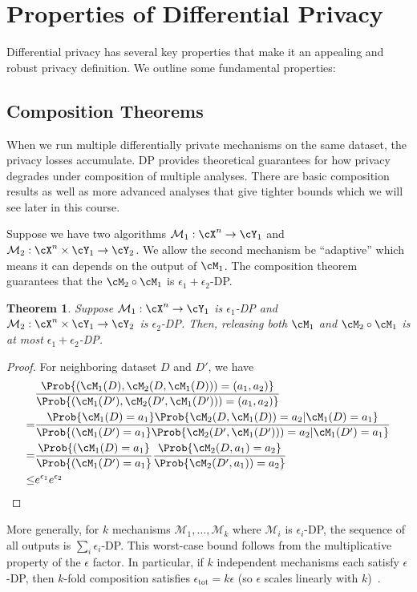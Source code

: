 \documentclass[11pt, a4paper]{article}
\newtheorem{theorem}{Theorem}
\begin{document}
\section{Properties of Differential Privacy}

Differential privacy has several key properties that make it an appealing 
and robust privacy definition. We outline some fundamental properties:

\subsection{Composition Theorems}

When we run multiple differentially private mechanisms on the same dataset,
the privacy losses accumulate.
DP provides theoretical guarantees for how privacy degrades under composition of multiple analyses.
There are basic composition results 
as well as more advanced analyses that give tighter bounds which we will see later in this course.

Suppose we have two algorithms $\mathcal{M}_1:\cX^n \rightarrow \cY_1$ and $\mathcal{M}_2:\cX^n\times \cY_1 \rightarrow \cY_2$.
We allow the second mechanism be ``adaptive'' which means it can depends on the output of $\cM_1$.
The composition theorem guarantees that the $\cM_2 \circ \cM_1$ is $\epsilon_1+\epsilon_2$-DP.
\begin{theorem}
    Suppose $\mathcal{M}_1:\cX^n \rightarrow \cY_1$ is $\epsilon_1$-DP and $\mathcal{M}_2:\cX^n\times \cY_1 \rightarrow \cY_2$ is $\epsilon_2$-DP.
    Then, releasing both $\cM_1$ and $\cM_2 \circ \cM_1$ is at most $\epsilon_1+\epsilon_2$-DP.
\end{theorem}
\begin{proof}
    For neighboring dataset $D$ and $D'$, we have
    \begin{align}
        & \frac{\Prob{(\cM_1(D), \cM_2(D, \cM_1(D))) = (a_1, a_2)} }{\Prob{(\cM_1(D'), \cM_2(D', \cM_1(D'))) = (a_1, a_2)}}\\
        =& \frac{\Prob{\cM_1(D)=a_1} \Prob{\cM_2(D, \cM_1(D)) = a_2|\cM_1(D)=a_1}}{\Prob{(\cM_1(D')=a_1} \Prob{\cM_2(D', \cM_1(D'))) = a_2|\cM_1(D')=a_1}}\\
        =& \frac{\Prob{(\cM_1(D)=a_1}} {\Prob{(\cM_1(D')=a_1}} \frac{\Prob{\cM_2(D, a_1) = a_2}}{\Prob{\cM_2(D', a_1)) = a_2}}\\
        \leq& e^{\epsilon_1}e^{\epsilon_2}
    \end{align}
\end{proof}
More generally, for $k$ mechanisms $\mathcal{M}_1,\dots,\mathcal{M}_k$ where $\mathcal{M}_i$ is $\epsilon_i$-DP, the sequence of all outputs is $\sum_{i}\epsilon_i$-DP.
This worst-case bound follows from the multiplicative property of the $\epsilon$ factor.
In particular, if $k$ independent mechanisms each satisfy $\epsilon$-DP,
then $k$-fold composition satisfies $\epsilon_\text{tot} = k\epsilon$ (so $\epsilon$ scales linearly with $k$)~\cite{DworkRoth2014}.
\end{document}

